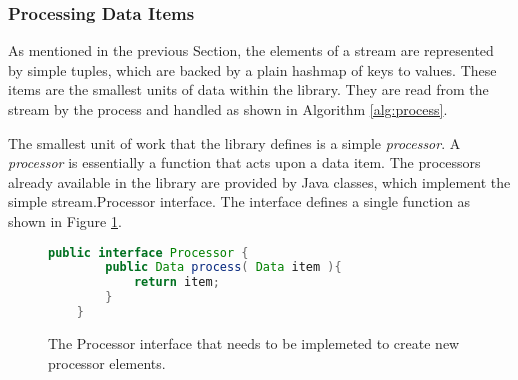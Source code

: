 \subsubsection{Processing Data Items}
As mentioned in the previous Section, the elements of a stream are represented by simple
tuples, which are backed by a plain hashmap of keys to values. These items are the smallest
units of data within the \streams library. They are read from the stream by the process and 
handled as shown in Algorithm \ref{alg:process}. 

The smallest unit of work that the \streams library defines is a simple {\em processor}.
A {\em processor} is essentially a function that acts upon a data item. The processors
already available in the library are provided by Java classes, which implement the
simple {\ttfamily stream.Processor} interface. The interface defines a single function as
shown in Figure \ref{fig:processFunction}.
\begin{figure}[h!]
	\begin{lstlisting}[language=Java,showstringspaces=false]
	public interface Processor {
	    public Data process( Data item ){
	    	return item;
	    }
	}
	\end{lstlisting}
	\caption{\label{fig:processFunction} The {\ttfamily Processor} interface that needs to be implemeted to create new processor elements.}
	\end{figure}
